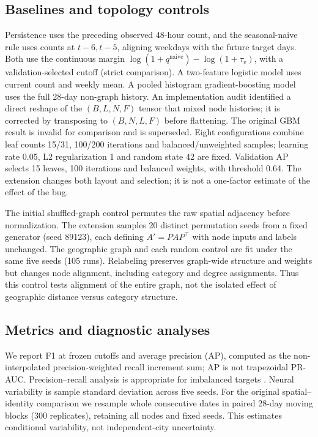 \documentclass[conference]{IEEEtran}
\begin{document}
\subsection{Baselines and topology controls}
Persistence uses the preceding observed 48-hour count, and the seasonal-naive rule uses counts at $t-6,t-5$, aligning weekdays with the future target days. Both use the continuous margin $\log(1+q^{\mathrm{naive}})-\log(1+\tau_v)$, with a validation-selected cutoff (strict comparison). A two-feature logistic model uses current count and weekly mean. A pooled histogram gradient-boosting model uses the full 28-day non-graph history. An implementation audit identified a direct reshape of the $(B,L,N,F)$ tensor that mixed node histories; it is corrected by transposing to $(B,N,L,F)$ before flattening. The original GBM result is invalid for comparison and is superseded. Eight configurations combine leaf counts 15/31, 100/200 iterations and balanced/unweighted samples; learning rate 0.05, L2 regularization 1 and random state 42 are fixed. Validation AP selects 15 leaves, 100 iterations and balanced weights, with threshold 0.64. The extension changes both layout and selection; it is not a one-factor estimate of the effect of the bug.

The initial shuffled-graph control permutes the raw spatial adjacency before normalization. The extension samples 20 distinct permutation seeds from a fixed generator (seed 89123), each defining $A'=PAP^\top$ with node inputs and labels unchanged. The geographic graph and each random control are fit under the same five seeds (105 runs). Relabeling preserves graph-wide structure and weights but changes node alignment, including category and degree assignments. Thus this control tests alignment of the entire graph, not the isolated effect of geographic distance versus category structure.

\subsection{Metrics and diagnostic analyses}
We report F1 at frozen cutoffs and average precision (AP), computed as the non-interpolated precision-weighted recall increment sum; AP is not trapezoidal PR-AUC. Precision--recall analysis is appropriate for imbalanced targets \cite{saito}. Neural variability is sample standard deviation across five seeds. For the original spatial--identity comparison we resample whole consecutive dates in paired 28-day moving blocks (300 replicates), retaining all nodes and fixed seeds. This estimates conditional variability, not independent-city uncertainty.
\end{document}
